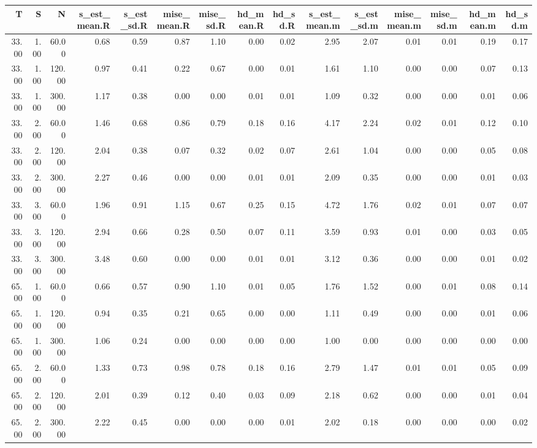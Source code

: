 \begin{table}[ht]
\centering
\begin{tabular}{rrrrrrrrrrrrrrr}
  \hline
T & S & N & s\_est\_mean.R & s\_est\_sd.R & mise\_mean.R & mise\_sd.R & hd\_mean.R & hd\_sd.R & s\_est\_mean.m & s\_est\_sd.m & mise\_mean.m & mise\_sd.m & hd\_mean.m & hd\_sd.m \\ 
  \hline
33.00 & 1.00 & 60.00 & 0.68 & 0.59 & 0.87 & 1.10 & 0.00 & 0.02 & 2.95 & 2.07 & 0.01 & 0.01 & 0.19 & 0.17 \\ 
  33.00 & 1.00 & 120.00 & 0.97 & 0.41 & 0.22 & 0.67 & 0.00 & 0.01 & 1.61 & 1.10 & 0.00 & 0.00 & 0.07 & 0.13 \\ 
  33.00 & 1.00 & 300.00 & 1.17 & 0.38 & 0.00 & 0.00 & 0.01 & 0.01 & 1.09 & 0.32 & 0.00 & 0.00 & 0.01 & 0.06 \\ 
  33.00 & 2.00 & 60.00 & 1.46 & 0.68 & 0.86 & 0.79 & 0.18 & 0.16 & 4.17 & 2.24 & 0.02 & 0.01 & 0.12 & 0.10 \\ 
  33.00 & 2.00 & 120.00 & 2.04 & 0.38 & 0.07 & 0.32 & 0.02 & 0.07 & 2.61 & 1.04 & 0.00 & 0.00 & 0.05 & 0.08 \\ 
  33.00 & 2.00 & 300.00 & 2.27 & 0.46 & 0.00 & 0.00 & 0.01 & 0.01 & 2.09 & 0.35 & 0.00 & 0.00 & 0.01 & 0.03 \\ 
  33.00 & 3.00 & 60.00 & 1.96 & 0.91 & 1.15 & 0.67 & 0.25 & 0.15 & 4.72 & 1.76 & 0.02 & 0.01 & 0.07 & 0.07 \\ 
  33.00 & 3.00 & 120.00 & 2.94 & 0.66 & 0.28 & 0.50 & 0.07 & 0.11 & 3.59 & 0.93 & 0.01 & 0.00 & 0.03 & 0.05 \\ 
  33.00 & 3.00 & 300.00 & 3.48 & 0.60 & 0.00 & 0.00 & 0.01 & 0.01 & 3.12 & 0.36 & 0.00 & 0.00 & 0.01 & 0.02 \\ 
  65.00 & 1.00 & 60.00 & 0.66 & 0.57 & 0.90 & 1.10 & 0.01 & 0.05 & 1.76 & 1.52 & 0.00 & 0.01 & 0.08 & 0.14 \\ 
  65.00 & 1.00 & 120.00 & 0.94 & 0.35 & 0.21 & 0.65 & 0.00 & 0.00 & 1.11 & 0.49 & 0.00 & 0.00 & 0.01 & 0.06 \\ 
  65.00 & 1.00 & 300.00 & 1.06 & 0.24 & 0.00 & 0.00 & 0.00 & 0.00 & 1.00 & 0.00 & 0.00 & 0.00 & 0.00 & 0.00 \\ 
  65.00 & 2.00 & 60.00 & 1.33 & 0.73 & 0.98 & 0.78 & 0.18 & 0.16 & 2.79 & 1.47 & 0.01 & 0.01 & 0.05 & 0.09 \\ 
  65.00 & 2.00 & 120.00 & 2.01 & 0.39 & 0.12 & 0.40 & 0.03 & 0.09 & 2.18 & 0.62 & 0.00 & 0.00 & 0.01 & 0.04 \\ 
  65.00 & 2.00 & 300.00 & 2.22 & 0.45 & 0.00 & 0.00 & 0.00 & 0.01 & 2.02 & 0.18 & 0.00 & 0.00 & 0.00 & 0.02 \\ 

\end{tabular}
\end{table}
